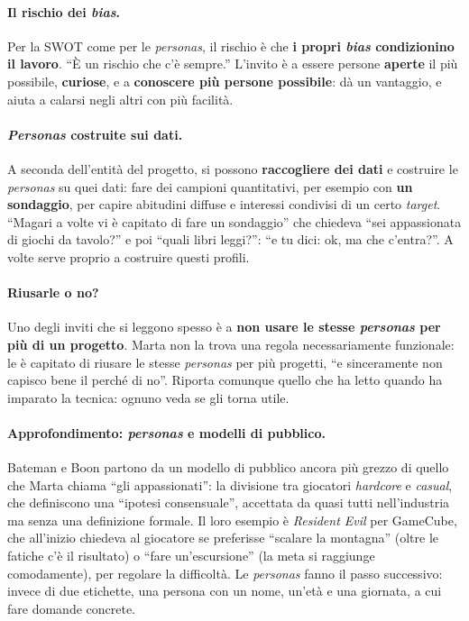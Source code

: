 \paragraph{Il rischio dei \emph{bias}.} Per la SWOT come per le \emph{personas}, il rischio è
che \textbf{i propri \emph{bias} condizionino il lavoro}. ``È un rischio che c'è sempre.''
L'invito è a essere persone \textbf{aperte} il più possibile, \textbf{curiose}, e a
\textbf{conoscere più persone possibile}: dà un vantaggio, e aiuta a calarsi negli altri con
più facilità.

\paragraph{\emph{Personas} costruite sui dati.} A seconda dell'entità del progetto, si possono
\textbf{raccogliere dei dati} e costruire le \emph{personas} su quei dati: fare dei campioni
quantitativi, per esempio con \textbf{un sondaggio}, per capire abitudini diffuse e interessi
condivisi di un certo \emph{target}. ``Magari a volte vi è capitato di fare un sondaggio'' che
chiedeva ``sei appassionata di giochi da tavolo?'' e poi ``quali libri leggi?'': ``e tu dici:
ok, ma che c'entra?''. A volte serve proprio a costruire questi profili.

\paragraph{Riusarle o no?} Uno degli inviti che si leggono spesso è a \textbf{non usare le
stesse \emph{personas} per più di un progetto}. Marta non la trova una regola necessariamente
funzionale: le è capitato di riusare le stesse \emph{personas} per più progetti, ``e
sinceramente non capisco bene il perché di no''. Riporta comunque quello che ha letto quando
ha imparato la tecnica: ognuno veda se gli torna utile.

\paragraph{Approfondimento: \emph{personas} e modelli di pubblico.} Bateman e Boon partono da
un modello di pubblico ancora più grezzo di quello che Marta chiama ``gli appassionati'': la
divisione tra giocatori \emph{hardcore} e \emph{casual}, che definiscono una ``ipotesi
consensuale'', accettata da quasi tutti nell'industria ma senza una definizione formale. Il
loro esempio è \emph{Resident Evil} per GameCube, che all'inizio chiedeva al giocatore se
preferisse ``scalare la montagna'' (oltre le fatiche c'è il risultato) o ``fare
un'escursione'' (la meta si raggiunge comodamente), per regolare la difficoltà. Le
\emph{personas} fanno il passo successivo: invece di due etichette, una persona con un nome,
un'età e una giornata, a cui fare domande concrete.

